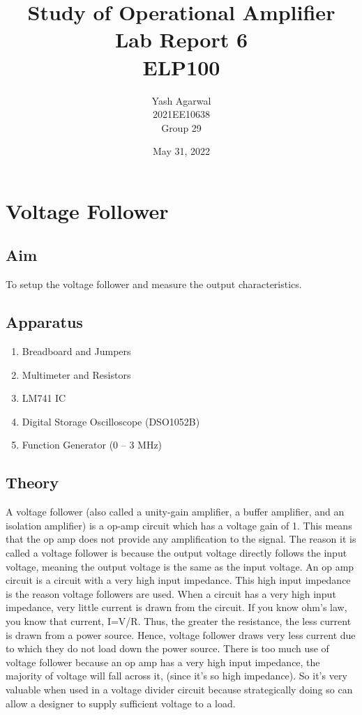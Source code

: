 \documentclass{article}
\title{Study of Operational Amplifier \\ Lab Report 6 \\ ELP100}
\author{Yash Agarwal \\ 2021EE10638 \\ Group 29}
\date{May 31, 2022}
\begin{document}
\pagecolor{yellow!15}
\maketitle
\vspace{15px}
\tableofcontents
{}
\newpage
\section{Voltage Follower}
\subsection{Aim}
To setup the voltage follower and measure the output characteristics.
\subsection{Apparatus}
\begin{enumerate}
\item Breadboard and Jumpers
\item Multimeter and Resistors
\item LM741 IC
\item Digital Storage Oscilloscope (DSO1052B)
\item Function Generator (0 – 3 MHz)
\end{enumerate}

\subsection{Theory}
\begin{figure}
\end{figure}
A voltage follower (also called a unity-gain amplifier, a buffer amplifier, and an isolation amplifier) is a op-amp circuit which has a voltage gain of 1. This means that the op amp does not provide any amplification to the signal. The reason it is called a voltage follower is because the output voltage directly follows the input voltage, meaning the output voltage is the same as the input voltage. An op amp circuit is a circuit with a very high input impedance. This high input impedance is the reason voltage followers are used. When a circuit has a very high input impedance, very little current is drawn from the circuit. If you know ohm's law, you know that current, I=V/R. Thus, the greater the resistance, the less current is drawn from a power source. Hence, voltage follower draws very less current due to which they do not load down the power source. There is too much use of voltage follower because an op amp has a very high input impedance, the majority of voltage will fall across it, (since it's so high impedance). So it's very valuable when used in a voltage divider circuit because strategically doing so can allow a designer to supply sufficient voltage to a load.
\end{document}
